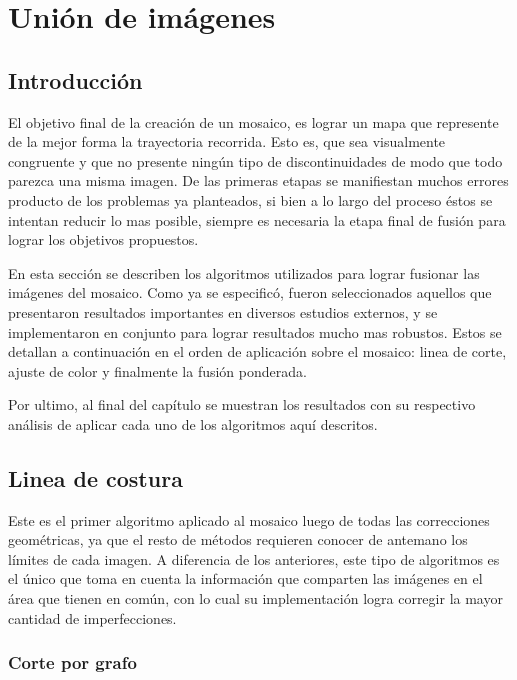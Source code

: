 \chapter{Unión de imágenes}
\label{capitulo5}


\section{Introducción}
El objetivo final de la creación de un mosaico, es lograr un mapa que represente de la mejor forma la trayectoria recorrida. Esto es, que sea visualmente congruente y que no presente ningún tipo de discontinuidades de modo que todo parezca una misma imagen. De las primeras etapas se manifiestan muchos errores producto de los problemas ya planteados, si bien a lo largo del proceso éstos se intentan reducir lo mas posible, siempre es necesaria la etapa final de fusión para lograr los objetivos propuestos.

En esta sección se describen los algoritmos utilizados para lograr fusionar las imágenes del mosaico. Como ya se especificó, fueron seleccionados aquellos que presentaron resultados importantes en diversos estudios externos, y se implementaron en conjunto para lograr resultados mucho mas robustos. Estos se detallan a continuación en el orden de aplicación sobre el mosaico: linea de corte, ajuste de color y finalmente la fusión ponderada.

Por ultimo, al final del capítulo se muestran los resultados con su respectivo análisis de aplicar cada uno de los algoritmos aquí descritos.
\clearpage


\section{Linea de costura}

Este es el primer algoritmo aplicado al mosaico luego de todas las correcciones geométricas, ya que el resto de métodos requieren conocer de antemano los límites de cada imagen. 
A diferencia de los anteriores, este tipo de algoritmos es el único que toma en cuenta la información que comparten las imágenes en el área que tienen en común, con lo cual su implementación logra corregir la mayor cantidad de imperfecciones. 


\subsection{Corte por grafo}

